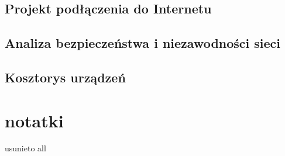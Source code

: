\documentclass{report}
\begin{document}
\section{Projekt podłączenia do Internetu}
\section{Analiza bezpieczeństwa i niezawodności sieci}
\section{Kosztorys urządzeń}



\chapter*{notatki}

usunieto all
\end{document}
